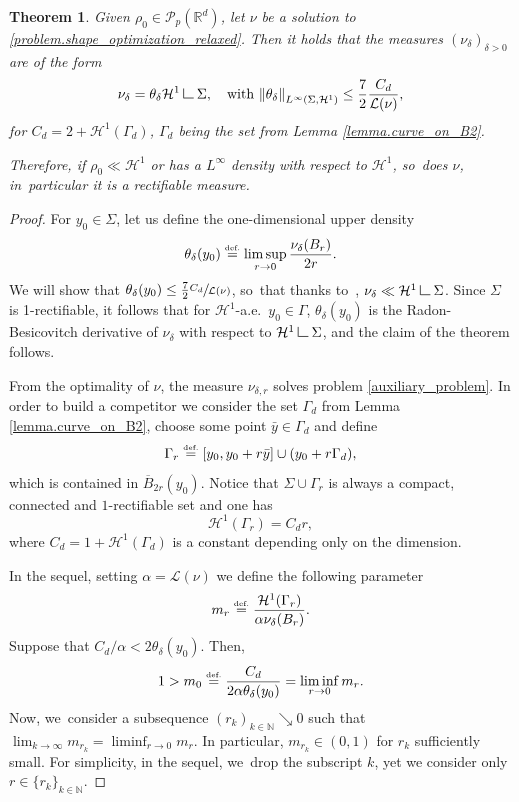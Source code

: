 \documentclass[JEP,XML,SOM,Unicode,NoFloatCountersInSection,published]{cedram}
\newtheorem{theorem}{Theorem}[section]
\theoremstyle{definition}
\newcommand{\eqdef}{\ensuremath{\stackrel{\mbox{\upshape\tiny def.}}{=}}}
\newcommand{\norm}[1]{\left\lVert#1\right\rVert}
\newcommand\LM[1]{\hbox{\vrule width.5pt \vbox to#1pt{\vfill \hrule width#1pt height.5pt}}}
\newcommand\LL{{\mathchoice {\>\LM7\>}{\>\LM7\>}{\,\LM5\,}{\,\LM{3.35}\,}}}
\newcommand{\mres}{\LL}
\newcommand\cH{\mathcal{H}}
\newcommand\cL{\mathcal{L}}
\newcommand{\RR}{\mathbb{R}}
\begin{document}
\begin{theorem}\label{theorem.solutions_are_absolutely_continuous}
Given $\rho_0 \in \mathcal{P}_p(\RR^d)$, let $\nu$ be a solution to \eqref{problem.shape_optimization_relaxed}.
Then it holds that the measures $\left(\nu_\delta\right)_{\delta > 0}$ are of the form
\[
\nu_\delta = \theta_\delta \cH^1\mres \Sigma,
\quad\text{with $
\norm{\theta_\delta}_{L^\infty(\Sigma, \cH^1)}
\le
\frac{7}{2}\frac{C_d}{\mathcal{L}(\nu)}$,}
\]
for $C_d = 2 + \cH^1(\Gamma_d)$, $\Gamma_d$ being the set from Lemma \ref{lemma.curve_on_B2}.

Therefore,
if $\rho_0 \ll \cH^1$ or has a $L^{\infty}$ density with respect to $\cH^1$, so~does $\nu$, in~particular it is a rectifiable measure.
\end{theorem}

\begin{proof}
For $y_0 \in \Sigma$, let us define the one-dimensional upper density~\cite[Def.\,2.55]{ambrosio2000functions}
\begin{equation*}
\theta_\delta(y_0)\eqdef\limsup_{r \to 0} \frac{\nu_{\delta}(B_r)}{2r}.
\end{equation*}
We will show that $\theta_{\delta}(y_0)\leq \frac{7}{2}\sfrac{C_d}{\cL(\nu)}$, so~that thanks to~\cite[Th.\,2.56]{ambrosio2000functions}, $\nu_\delta \ll \cH^1\mres\Sigma$.
Since $\Sigma$ is 1-rectifiable, it follows that for $\cH^1$-a.e.~$y_0 \in \Gamma$, $\theta_\delta(y_0)$ is the Radon-Besicovitch
derivative of $\nu_\delta$ with respect to $\cH^1\mres\Sigma$, and the claim of the theorem follows.

From the optimality of $\nu$, the measure $\nu_{\delta,r}$ solves problem \eqref{auxiliary_problem}. In order to build a competitor we consider the set $\Gamma_d$ from Lemma \ref{lemma.curve_on_B2}, choose some point $\bar y \in \Gamma_d$ and define
\[
\Gamma_r
\eqdef
[y_0, y_0 + r\bar y]\cup
(y_0 + r\Gamma_d),
\]
which is contained in $\overline{B}_{2r}(y_0)$. Notice that $\Sigma \cup \Gamma_{r}$ is always a compact, connected and $1$-rectifiable set and one has
\[
\cH^1(\Gamma_{r})
=
C_dr,
\]
where $C_d = 1 + \cH^1(\Gamma_d)$ is a constant depending only on the dimension.

In the sequel, setting $\alpha = \mathcal{L}(\nu)$ we define the following parameter
\[
m_{r} \eqdef
\frac{\cH^1(\Gamma_r)}{\alpha \nu_\delta(B_r)}.\]
Suppose that $C_d/\alpha < 2\theta_{\delta}(y_0)$. Then,
\begin{equation*}
1> m_0\eqdef\frac{C_d}{2\alpha\theta_\delta(y_0)}= \liminf_{r \to 0} m_r.
\end{equation*}
Now, we~consider a subsequence $(r_{k})_{k\in \mathbb{N}}\searrow 0$ such that $\lim_{k \to \infty} m_{r_k}=\liminf_{r \to 0} m_r$. In particular, $m_{r_k} \in (0,1)$ for $r_k$ sufficiently small.
For simplicity, in the sequel, we~drop the subscript $k$, yet we consider only $r \in \{r_{k}\}_{k\in \mathbb{N}}$.


\end{proof}
\end{document}
